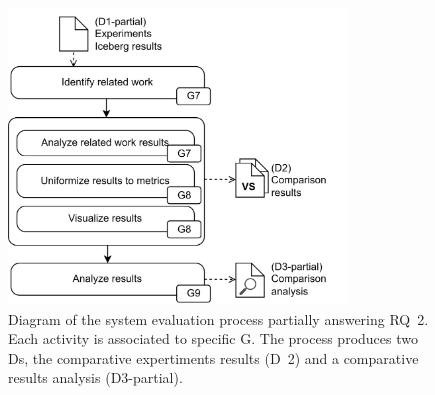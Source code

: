 \begin{figure}[!ht]
    \begin{center}
    \includegraphics[width=0.8\textwidth]{figures/3-method/method_comp.png}
    \caption[System evaluation process - Iceberg vs. Delta Lake]{Diagram of the system evaluation process partially answering \gls{RQ}~2. Each activity is associated to specific \gls{G}. The process produces two \glspl{D}, the comparative expertiments results (\gls{D}~2) and a comparative results analysis (\gls{D}3-partial).}
    \label{fig:method_comparison}
    \end{center}
\end{figure}